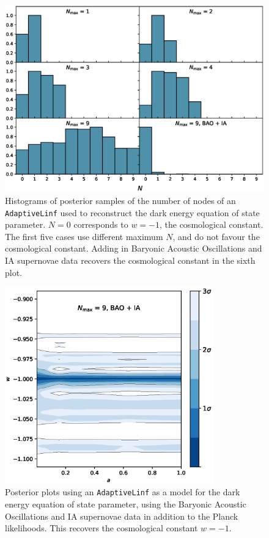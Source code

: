 \documentclass{article}
\begin{document}
\newpage

\begin{figure}[H]
  \centering
  \includegraphics[width=13cm]{darkN.eps}
  \caption{Histograms of posterior samples of the number of nodes of an \texttt{AdaptiveLinf} used to reconstruct the dark energy equation of state parameter. $N=0$ corresponds to $w=-1$, the cosmological constant. The first five cases use different maximum $N$, and do not favour the cosmological constant. Adding in Baryonic Acoustic Oscillations and IA supernovae data recovers the cosmological constant in the sixth plot.}
  \label{fig:darkN}
\end{figure}

\begin{figure}[H]
  \centering
  \includegraphics[width=9cm]{darkNbao.eps}
  \caption{Posterior plots using an \texttt{AdaptiveLinf} as a model for the dark energy equation of state parameter, using the Baryonic Acoustic Oscillations and IA supernovae data in addition to the Planck likelihoods. This recovers the cosmological constant $w=-1$.}
  \label{fig:darkNbao}
\end{figure}
\end{document}

